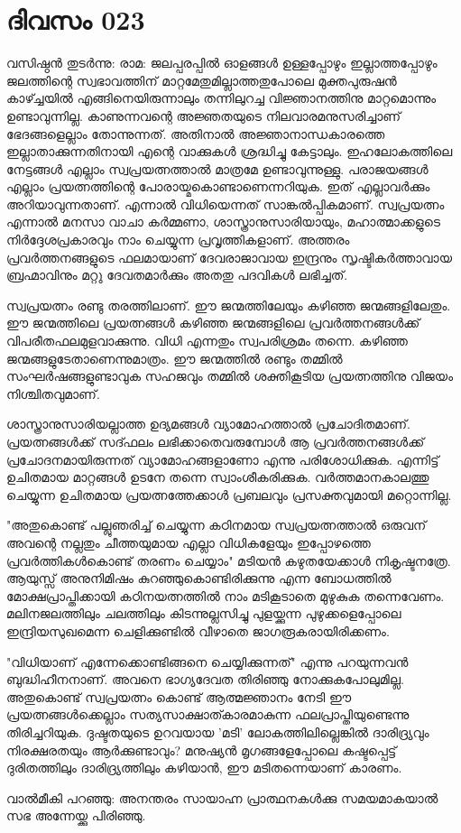 \newpage
\section{ദിവസം 023}


വസിഷ്ഠന്‍ തുടര്‍ന്നു: രാമ: ജലപ്പരപ്പില്‍ ഓളങ്ങള്‍ ഉള്ളപ്പോഴും ഇല്ലാത്തപ്പോഴും ജലത്തിന്റെ സ്വഭാവത്തിന്‌ മാറ്റമേതുമില്ലാത്തതുപോലെ മുക്തപുരുഷന്‍ കാഴ്ച്ചയില്‍ എങ്ങിനെയിരുന്നാലും തന്നിലുറച്ച വിജ്ഞാനത്തിനു മാറ്റമൊന്നും ഉണ്ടാവുന്നില്ല. കാണുന്നവന്റെ അജ്ഞതയുടെ നിലവാരമനുസരിച്ചാണ്‌ ഭേദങ്ങളെല്ലാം തോന്നുന്നത്‌. അതിനാല്‍ അജ്ഞാനാന്ധകാരത്തെ ഇല്ലാതാക്കുന്നതിനായി എന്റെ വാക്കുകള്‍ ശ്രദ്ധിച്ചു കേട്ടാലും. ഇഹലോകത്തിലെ നേട്ടങ്ങള്‍ എല്ലാം സ്വപ്രയത്നത്താല്‍ മാത്രമേ ഉണ്ടാവുന്നുള്ളു. പരാജയങ്ങള്‍ എല്ലാം പ്രയത്നത്തിന്റെ പോരായ്മകൊണ്ടാണെന്നറിയുക. ഇത്‌ എല്ലാവര്‍ക്കും അറിയാവുന്നതാണ്‌. എന്നാല്‍ വിധിയെന്നത്‌ സാങ്കല്‍പ്പികമാണ്‌. സ്വപ്രയത്നം എന്നാല്‍ മനസാ വാചാ കര്‍മ്മണാ, ശാസ്ത്രാനുസാരിയായും, മഹാത്മാക്കളുടെ നിര്‍ദ്ദേശപ്രകാരവും നാം ചെയ്യുന്ന പ്രവൃത്തികളാണ്‌. അത്തരം പ്രവര്‍ത്തനങ്ങളുടെ ഫലമായാണ്‌ ദേവരാജാവായ ഇന്ദ്രനും സൃഷ്ടികര്‍ത്താവായ ബ്രഹ്മാവിനും മറ്റു ദേവതമാര്‍ക്കും അതതു പദവികള്‍ ലഭിച്ചത്‌. 

സ്വപ്രയത്നം രണ്ടു തരത്തിലാണ്‌. ഈ ജന്മത്തിലേയും കഴിഞ്ഞ ജന്മങ്ങളിലേതും. ഈ ജന്മത്തിലെ പ്രയത്നങ്ങള്‍ കഴിഞ്ഞ ജന്മങ്ങളിലെ പ്രവര്‍ത്തനങ്ങള്‍ക്ക്‌ വിപരീതഫലമുളവാക്കുന്നു. വിധി എന്നതും സ്വപരിശ്രമം തന്നെ. കഴിഞ്ഞ ജന്മങ്ങളുടേതാണെന്നുമാത്രം. ഈ ജന്മത്തില്‍ രണ്ടും തമ്മില്‍ സംഘര്‍ഷങ്ങളുണ്ടാവുക സഹജവും തമ്മില്‍ ശക്തികൂടിയ പ്രയത്നത്തിനു വിജയം നിശ്ചിതവുമാണ്‌. 

ശാസ്ത്രാനുസാരിയല്ലാത്ത ഉദ്യമങ്ങള്‍ വ്യാമോഹത്താല്‍ പ്രചോദിതമാണ്‌. പ്രയത്നങ്ങള്‍ക്ക്‌ സദ്ഫലം ലഭിക്കാതെവരുമ്പോള്‍ ആ പ്രവര്‍ത്തനങ്ങള്‍ക്ക്‌ പ്രചോദനമായിരുന്നത്‌ വ്യാമോഹങ്ങളാണോ എന്നു പരിശോധിക്കുക. എന്നിട്ട്‌ ഉചിതമായ മാറ്റങ്ങള്‍ ഉടനേ തന്നെ സ്വാംശീകരിക്കുക. വര്‍ത്തമാനകാലത്തു ചെയ്യുന്ന ഉചിതമായ പ്രയത്നത്തേക്കാള്‍ പ്രബലവും പ്രസക്തവുമായി മറ്റൊന്നില്ല.

"അതുകൊണ്ട്‌ പല്ലുഞരിച്ച്‌ ചെയ്യുന്ന കഠിനമായ സ്വപ്രയത്നത്താല്‍ ഒരുവന്‌ അവന്റെ നല്ലതും ചീത്തയുമായ എല്ലാ വിധികളേയും ഇപ്പോഴത്തെ പ്രവര്‍ത്തികള്‍കൊണ്ട്‌ തരണം ചെയ്യാം" മടിയന്‍ കഴുതയേക്കാള്‍ നികൃഷ്ടനത്രേ. ആയുസ്സ്‌ അനുനിമിഷം കുറഞ്ഞുകൊണ്ടിരിക്കുന്നു എന്ന ബോധത്തില്‍ മോക്ഷപ്രാപ്തിക്കായി കഠിനയത്നത്തില്‍ നാം മടികൂടാതെ മുഴുകുക തന്നെവേണം. മലിനജലത്തിലും ചലത്തിലും കിടന്നുല്ലസിച്ചു പുളയ്ക്കുന്ന പുഴുക്കളെപ്പോലെ ഇന്ദ്രിയസുഖമെന്ന ചെളിക്കുണ്ടില്‍ വീഴാതെ ജാഗരൂകരായിരിക്കണം.

"വിധിയാണ്‌ എന്നേക്കൊണ്ടിങ്ങനെ ചെയ്യിക്കുന്നത്‌" എന്നു പറയുന്നവന്‍ ബുദ്ധിഹീനനാണ്‌. അവനെ ഭാഗ്യദേവത തിരിഞ്ഞു നോക്കുകപോലുമില്ല. അതുകൊണ്ട്‌ സ്വപ്രയത്നം കൊണ്ട്‌ ആത്മജ്ഞാനം നേടി ഈ പ്രയത്നങ്ങള്‍ക്കെല്ലാം സത്യസാക്ഷാത്കാരമാകുന്ന ഫലപ്രാപ്തിയുണ്ടെന്നു തിരിച്ചറിയുക. ദുഷ്ടതയുടെ ഉറവയായ 'മടി' ലോകത്തിലില്ലെങ്കില്‍ ദാരിദ്ര്യവും നിരക്ഷരതയും ആര്‍ക്കുണ്ടാവും? മനുഷ്യന്‍ മൃഗങ്ങളേപ്പോലെ കഷ്ടപ്പെട്ട്‌ ദുരിതത്തിലും ദാരിദ്ര്യത്തിലും കഴിയാന്‍, ഈ മടിതന്നെയാണ് കാരണം. 

വാല്‍മീകി പറഞ്ഞു: അനന്തരം സായാഹ്ന പ്രാത്ഥനകള്‍ക്കു സമയമാകയാല്‍ സഭ അന്നേയ്ക്കു പിരിഞ്ഞു. 
